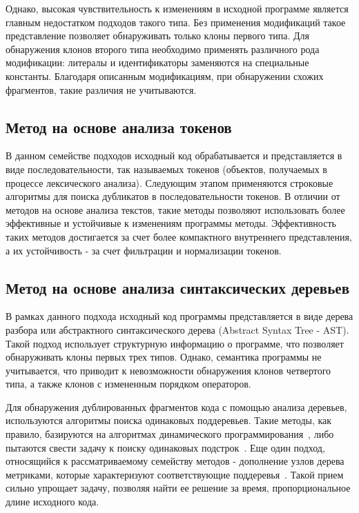 Однако, высокая чувствительность к изменениям в исходной программе является главным недостатком подходов такого типа. Без применения модификаций такое представление позволяет обнаруживать только клоны первого типа. Для обнаружения клонов второго типа необходимо применять различного рода модификации: литералы и идентификаторы заменяются на специальные константы. Благодаря описанным модификациям, при обнаружении схожих фрагментов, такие различия не учитываются.

\subsection{Метод на основе анализа токенов}

В данном семействе подходов исходный код обрабатывается и представляется в виде последовательности, так называемых токенов (объектов, получаемых в процессе лексического анализа). Следующим этапом применяются строковые алгоритмы для поиска дубликатов в последовательности токенов. В отличии от методов на основе анализа текстов, такие методы позволяют использовать более эффективные и устойчивые к изменениям программы методы. Эффективность таких методов достигается за счет более компактного внутреннего представления, а их устойчивость - за счет фильтрации и нормализации токенов.

\subsection{Метод на основе анализа синтаксических деревьев}

В рамках данного подхода исходный код программы представляется в виде дерева разбора или абстрактного синтаксического дерева (Abstract Syntax Tree - AST). Такой подход использует структурную информацию о программе, что позволяет обнаруживать клоны первых трех типов. Однако, семантика программы не учитывается, что приводит к невозможности обнаружения клонов четвертого типа, а также клонов с измененным порядком операторов.

Для обнаружения дублированных фрагментов кода с помощью анализа деревьев, используются алгоритмы поиска одинаковых поддеревьев. Такие методы, как правило, базируются на алгоритмах динамического программирования~\cite{dynamicprog}, либо пытаются свести задачу к поиску одинаковых подстрок~\cite{substrings}. Еще один подход, относящийся к рассматриваемому семейству методов - дополнение узлов дерева метриками, которые характеризуют соответствующие поддеревья~\cite{subtrees}. Такой прием сильно упрощает задачу, позволяя найти ее решение за время, пропорциональное длине исходного кода.

